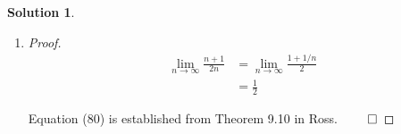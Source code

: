 \documentclass[12pt]{article}
\theoremstyle{definition} %
\newtheorem{solution}{Solution}
\theoremstyle{plain} %
\begin{document}
\begin{solution}
\begin{enumerate}
\begin{proof}
            The inductive step:
            \begin{align}
                t_{n+1} &= \frac{(n+1) + 1}{2(n+1)} \tag{74} \\
                &= \frac{n + 2}{2(n+1)} \tag{75} \\
                &= \left[ 1 - \frac{1}{(n+1)^2} \right] t_n \tag{76} \\
                &= \left[ 1 - \frac{1}{(n+1)^2} \right] \left( \frac{n+1}{2n} \right) \tag{77} \\
                &= \frac{(n+1)^2 (n+1)}{2n(n+1)^2} - \frac{n+1}{2n(n+1)^2} \tag{78} \\
                &= \frac{n+2}{2(n+1)} \tag{79}
            \end{align}
        
            Thus, the proof is complete.
        \end{proof}
        \item \begin{proof}
            \begin{align}
                \lim_{n \to \infty} \frac{n + 1}{2n} &= \lim_{n \to \infty} \frac{1 + 1/n}{2} \tag{80} \\
                &= \frac{1}{2} \tag{81}
            \end{align}
        
            Equation (80) is established from Theorem 9.10 in Ross. $\qed$
        \end{proof} 
    \end{enumerate}
\end{solution}
\end{document}
